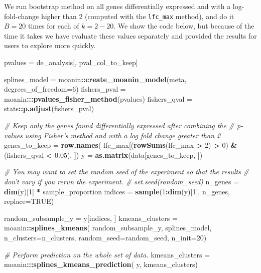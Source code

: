 \documentclass[9pt,a4paper,]{extarticle}
\newenvironment{Shaded}{\begin{snugshade}}{\end{snugshade}}
\newcommand{\CommentTok}[1]{\textcolor[rgb]{0.56,0.35,0.01}{\textit{#1}}}
\newcommand{\DataTypeTok}[1]{\textcolor[rgb]{0.13,0.29,0.53}{#1}}
\newcommand{\DecValTok}[1]{\textcolor[rgb]{0.00,0.00,0.81}{#1}}
\newcommand{\FloatTok}[1]{\textcolor[rgb]{0.00,0.00,0.81}{#1}}
\newcommand{\KeywordTok}[1]{\textcolor[rgb]{0.13,0.29,0.53}{\textbf{#1}}}
\newcommand{\NormalTok}[1]{#1}
\newcommand{\OperatorTok}[1]{\textcolor[rgb]{0.81,0.36,0.00}{\textbf{#1}}}
\newcommand{\OtherTok}[1]{\textcolor[rgb]{0.56,0.35,0.01}{#1}}
\newcommand{\StringTok}[1]{\textcolor[rgb]{0.31,0.60,0.02}{#1}}
\begin{document}
We run bootstrap method on all genes differentially expressed and with a
log-fold-change higher than 2 (computed with the \texttt{lfc\_max} method), and do it
\(B=20\) times for each of \(k=2-20\). We show the code below, but because of the
time it takes we have evaluate these values separately and provided the
results for users to explore more quickly.

\begin{Shaded}
\begin{Highlighting}[]
\NormalTok{pvalues =}\StringTok{ }\NormalTok{de_analysis[, pval_col_to_keep]}

\NormalTok{splines_model =}\StringTok{ }\NormalTok{moanin}\OperatorTok{::}\KeywordTok{create_moanin_model}\NormalTok{(meta, }\DataTypeTok{degrees_of_freedom=}\DecValTok{6}\NormalTok{)}
\NormalTok{fishers_pval =}\StringTok{ }\NormalTok{moanin}\OperatorTok{:::}\KeywordTok{pvalues_fisher_method}\NormalTok{(pvalues)}
\NormalTok{fishers_qval =}\StringTok{ }\NormalTok{stats}\OperatorTok{::}\KeywordTok{p.adjust}\NormalTok{(fishers_pval)}

\CommentTok{# Keep only the genes found differentially expressed after combining the}
\CommentTok{# p-values using Fisher's method and with a log fold change greater than 2}
\NormalTok{genes_to_keep =}\StringTok{ }\KeywordTok{row.names}\NormalTok{(}
\NormalTok{    lfc_max[(}\KeywordTok{rowSums}\NormalTok{(lfc_max }\OperatorTok{>}\StringTok{ }\DecValTok{2}\NormalTok{) }\OperatorTok{>}\StringTok{ }\DecValTok{0}\NormalTok{) }\OperatorTok{&}\StringTok{ }\NormalTok{(fishers_qval }\OperatorTok{<}\StringTok{ }\FloatTok{0.05}\NormalTok{), ])}
\NormalTok{y =}\StringTok{ }\KeywordTok{as.matrix}\NormalTok{(data[genes_to_keep, ])}

\CommentTok{# You may want to set the random seed of the experiment so that the results}
\CommentTok{# don't vary if you rerun the experiment.}
\CommentTok{# set.seed(random_seed)}
\NormalTok{n_genes =}\StringTok{ }\KeywordTok{dim}\NormalTok{(y)[}\DecValTok{1}\NormalTok{] }\OperatorTok{*}\StringTok{ }\NormalTok{sample_proportion}
\NormalTok{indices =}\StringTok{ }\KeywordTok{sample}\NormalTok{(}\DecValTok{1}\OperatorTok{:}\KeywordTok{dim}\NormalTok{(y)[}\DecValTok{1}\NormalTok{], n_genes, }\DataTypeTok{replace=}\OtherTok{TRUE}\NormalTok{)}

\NormalTok{random_subsample_y =}\StringTok{ }\NormalTok{y[indices, ]}
\NormalTok{kmeans_clusters =}\StringTok{ }\NormalTok{moanin}\OperatorTok{::}\KeywordTok{splines_kmeans}\NormalTok{(}
\NormalTok{    random_subsample_y, splines_model, }\DataTypeTok{n_clusters=}\NormalTok{n_clusters,}
    \DataTypeTok{random_seed=}\NormalTok{random_seed,}
    \DataTypeTok{n_init=}\DecValTok{20}\NormalTok{)}

\CommentTok{# Perform prediction on the whole set of data.}
\NormalTok{kmeans_clusters =}\StringTok{ }\NormalTok{moanin}\OperatorTok{:::}\KeywordTok{splines_kmeans_prediction}\NormalTok{(}
\NormalTok{    y, kmeans_clusters)}
\end{Highlighting}
\end{Shaded}
\end{document}
